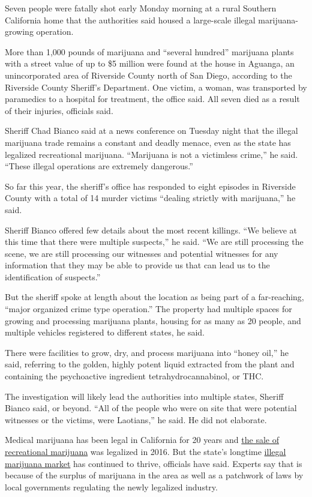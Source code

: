 Seven people were fatally shot early Monday morning at a rural Southern
California home that the authorities said housed a large-scale illegal
marijuana-growing operation.

More than 1,000 pounds of marijuana and ``several hundred'' marijuana
plants with a street value of up to \$5 million were found at the house
in Aguanga, an unincorporated area of Riverside County north of San
Diego, according to the Riverside County Sheriff's Department. One
victim, a woman, was transported by paramedics to a hospital for
treatment, the office said. All seven died as a result of their
injuries, officials said.

Sheriff Chad Bianco said at a news conference on Tuesday night that the
illegal marijuana trade remains a constant and deadly menace, even as
the state has legalized recreational marijuana. ``Marijuana is not a
victimless crime,'' he said. ``These illegal operations are extremely
dangerous.''

So far this year, the sheriff's office has responded to eight episodes
in Riverside County with a total of 14 murder victims ``dealing strictly
with marijuana,'' he said.

Sheriff Bianco offered few details about the most recent killings. ``We
believe at this time that there were multiple suspects,'' he said. ``We
are still processing the scene, we are still processing our witnesses
and potential witnesses for any information that they may be able to
provide us that can lead us to the identification of suspects.''

But the sheriff spoke at length about the location as being part of a
far-reaching, ``major organized crime type operation.'' The property had
multiple spaces for growing and processing marijuana plants, housing for
as many as 20 people, and multiple vehicles registered to different
states, he said.

There were facilities to grow, dry, and process marijuana into ``honey
oil,'' he said, referring to the golden, highly potent liquid extracted
from the plant and containing the psychoactive ingredient
tetrahydrocannabinol, or THC.

The investigation will likely lead the authorities into multiple states,
Sheriff Bianco said, or beyond. ``All of the people who were on site
that were potential witnesses or the victims, were Laotians,'' he said.
He did not elaborate.

Medical marijuana has been legal in California for 20 years and
\href{https://www.nytimes3xbfgragh.onion/2016/11/09/us/politics/marijuana-legalization.html}{the
sale of recreational marijuana} was legalized in 2016. But the state's
longtime
\href{https://www.nytimes3xbfgragh.onion/2019/04/27/us/marijuana-california-legalization.html}{illegal
marijuana market} has continued to thrive, officials have said. Experts
say that is because of the surplus of marijuana in the area as well as a
patchwork of laws by local governments regulating the newly legalized
industry.

